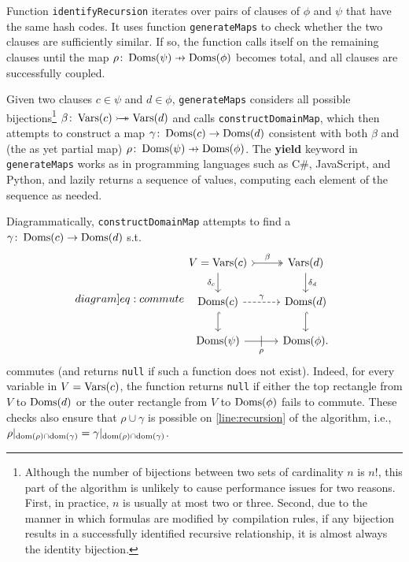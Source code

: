 Function \texttt{identifyRecursion} iterates over pairs of clauses of $\phi$ and
$\psi$ that have the same hash codes. It uses function \texttt{generateMaps} to
check whether the two clauses are sufficiently similar. If so, the function
calls itself on the remaining clauses until the map
$\rho\colon \Doms(\psi) \pfun \Doms(\phi)$ becomes total, and all clauses are
successfully coupled.

Given two clauses $c \in \psi$ and $d \in \phi$, \texttt{generateMaps} considers
all possible bijections\footnote{Although the number of bijections between two
  sets of cardinality $n$ is $n!$, this part of the algorithm is unlikely to
  cause performance issues for two reasons. First, in practice, $n$ is usually
  at most two or three. Second, due to the manner in which formulas are modified
  by compilation rules, if any bijection results in a successfully identified
  recursive relationship, it is almost always the identity bijection.}
$\beta\colon \operatorname{Vars}(c) \mathrel{\rightarrowtail\kern-1.9ex\twoheadrightarrow} \operatorname{Vars}(d)$ and calls
\texttt{constructDomainMap}, which then attempts to construct a map
$\gamma\colon \operatorname{Doms}(c) \to \operatorname{Doms}(d)$ consistent with both $\beta$ and (the as
yet partial map) $\rho\colon \Doms(\psi) \pfun \Doms(\phi)$. The \textbf{yield}
keyword in \texttt{generateMaps} works as in programming languages such as C\#,
JavaScript, and Python, and lazily returns a sequence of values, computing each
element of the sequence as needed.

Diagrammatically, \texttt{constructDomainMap} attempts to find a
$\gamma\colon \operatorname{Doms}(c) \to \operatorname{Doms}(d)$ s.t.
\begin{equation} \label[diagram]{eq:commute}
  \begin{tikzcd}
    V = \Vars(c) \ar[r, tail, two heads, "\beta"] \arrow[d, swap, "\delta_c"] & \Vars(d) \ar[d, "\delta_d"] \\
    \Doms(c) \ar[r, dashed, "\gamma"] \ar[d, hookrightarrow] & \Doms(d) \ar[d, hookrightarrow] \\
    \Doms(\psi) \ar[r, swap, "\rho", "|" marking, outer sep=5pt] & \Doms(\phi).
  \end{tikzcd}
\end{equation}
commutes (and returns \texttt{null} if such a function does not exist). Indeed,
for every variable in $V = \operatorname{Vars}(c)$, the function returns \texttt{null} if
either the top rectangle from $V$ to $\operatorname{Doms}(d)$ or the outer rectangle from $V$
to $\operatorname{Doms}(\phi)$ fails to commute. These checks also ensure that
$\rho \cup \gamma$ is possible on \cref{line:recursion} of the algorithm, i.e.,
$\rho|_{\operatorname{dom}(\rho)\cap\operatorname{dom}(\gamma)} = \gamma|_{\operatorname{dom}(\rho)\cap\operatorname{dom}(\gamma)}$.

